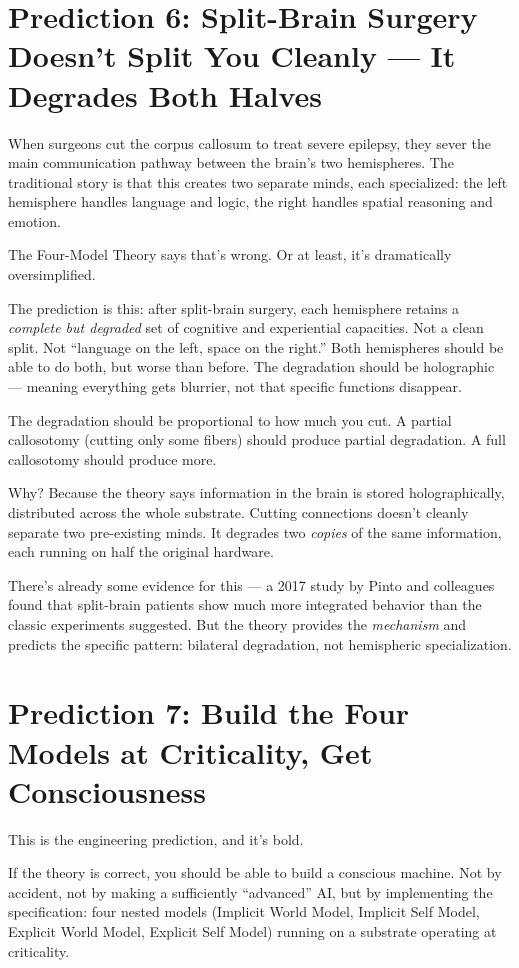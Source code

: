 \documentclass[11pt, twoside, openright]{book}
\begin{document}
\section*{Prediction 6: Split-Brain Surgery Doesn't Split You Cleanly --- It Degrades Both Halves}

When surgeons cut the corpus callosum to treat severe epilepsy, they sever the main communication pathway between the brain's two hemispheres. The traditional story is that this creates two separate minds, each specialized: the left hemisphere handles language and logic, the right handles spatial reasoning and emotion.

The Four-Model Theory says that's wrong. Or at least, it's dramatically oversimplified.

The prediction is this: after split-brain surgery, each hemisphere retains a \textit{complete but degraded} set of cognitive and experiential capacities. Not a clean split. Not ``language on the left, space on the right.'' Both hemispheres should be able to do both, but worse than before. The degradation should be holographic --- meaning everything gets blurrier, not that specific functions disappear.

The degradation should be proportional to how much you cut. A partial callosotomy (cutting only some fibers) should produce partial degradation. A full callosotomy should produce more.

Why? Because the theory says information in the brain is stored holographically, distributed across the whole substrate. Cutting connections doesn't cleanly separate two pre-existing minds. It degrades two \textit{copies} of the same information, each running on half the original hardware.

There's already some evidence for this --- a 2017 study by Pinto and colleagues found that split-brain patients show much more integrated behavior than the classic experiments suggested. But the theory provides the \textit{mechanism} and predicts the specific pattern: bilateral degradation, not hemispheric specialization.

\section*{Prediction 7: Build the Four Models at Criticality, Get Consciousness}

This is the engineering prediction, and it's bold.

If the theory is correct, you should be able to build a conscious machine. Not by accident, not by making a sufficiently ``advanced'' AI, but by implementing the specification: four nested models (Implicit World Model, Implicit Self Model, Explicit World Model, Explicit Self Model) running on a substrate operating at criticality.
\end{document}
